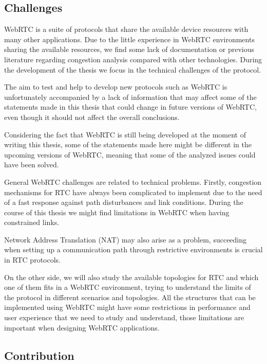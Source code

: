 \subsection{Challenges}

WebRTC is a suite of protocols that share the available device resources with many other applications. Due to the little experience in WebRTC environments sharing the available resources, we find some lack of documentation or previous literature regarding congestion analysis compared with other technologies. During the development of the thesis we focus in the technical challenges of the protocol.

The aim to test and help to develop new protocols such as WebRTC is unfortunately accompanied by a lack of information that may affect some of the statements made in this thesis that could change in future versions of WebRTC, even though it should not affect the overall conclusions.

Considering the fact that WebRTC is still being developed at the moment of writing this thesis, some of the statements made here might be different in the upcoming versions of WebRTC, meaning that some of the analyzed issues could have been solved.

General WebRTC challenges are related to technical problems. Firstly, congestion mechanisms for RTC have always been complicated to implement due to the need of a fast response against path disturbances and link conditions. During the course of this thesis we might find limitations in WebRTC when having constrained links.

Network Address Translation (NAT)  may also arise as a problem, succeeding when setting up a communication path through restrictive environments is crucial in RTC protocols.

On the other side, we will also study the available topologies for RTC and which one of them fits in a WebRTC environment, trying to understand the limits of the protocol in different scenarios and topologies. All the structures that can be implemented using WebRTC might have some restrictions in performance and user experience that we need to study and understand, those limitations are important when designing WebRTC applications.

\subsection{Contribution}

